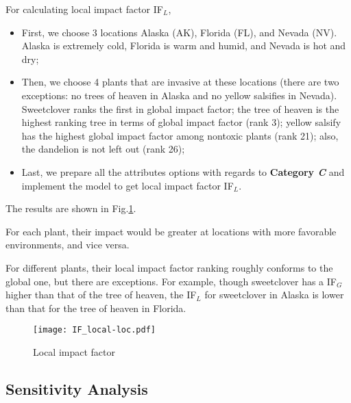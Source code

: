 \documentclass[12pt]{article}
\begin{document}
		For calculating local impact factor IF$_L$,
		\vspace{-0.2cm}
		\begin{itemize}
		\item First, we choose 3 locations Alaska (AK), Florida (FL), and Nevada (NV).  Alaska is extremely cold, Florida is warm and humid, and Nevada is hot and dry;
		\vspace{-0.2cm}
		\item Then, we choose 4 plants that are invasive at these locations (there are two exceptions: no trees of heaven in Alaska and no yellow salsifies in Nevada).  Sweetclover ranks the first in global impact factor; the tree of heaven is the highest ranking tree in terms of global impact factor (rank 3); yellow salsify has the highest global impact factor among nontoxic plants (rank 21); also, the dandelion is not left out (rank 26);
		\vspace{-0.2cm}
		\item Last, we prepare all the attributes options with regards to \textbf{Category \textit{C}} and implement the model to get local impact factor IF$_L$.
		\end{itemize} 	
		
		The results are shown in Fig.\ref{fig:IFLocal}.  
		
		For each plant, their impact would be greater at locations with more favorable environments, and vice versa.
		
		For different plants, their local impact factor ranking roughly conforms to the global one, but there are exceptions.  For example, though sweetclover has a IF$_G$ higher than that of the tree of heaven, the IF$_L$ for sweetclover in Alaska is lower than that for the tree of heaven in Florida.
		
		\begin{figure}[htbp]
			\centering
			\texttt{[image: IF\_local-loc.pdf]}
			\caption{Local impact factor}
			\label{fig:IFLocal}
		\end{figure}

	\newpage
	
	\subsection{Sensitivity Analysis}
	
\end{document}
